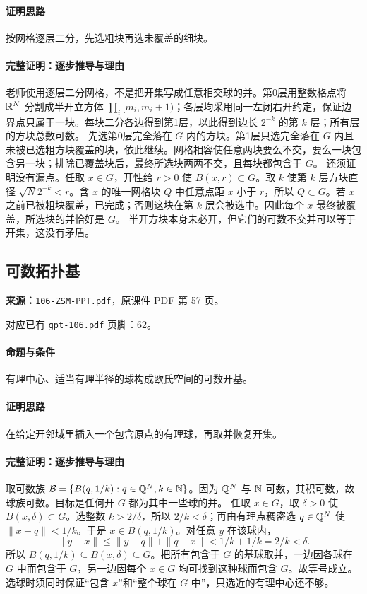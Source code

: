 \paragraph{证明思路}按网格逐层二分，先选粗块再选未覆盖的细块。
\paragraph{完整证明：逐步推导与理由}

老师使用逐层二分网格，不是把开集写成任意相交球的并。第0层用整数格点将 $\mathbb{R}^N$ 分割成半开立方体 $\prod_i[m_i,m_i+1)$；各层均采用同一左闭右开约定，保证边界点只属于一块。每块二分各边得到第1层，以此得到边长 $2^{-k}$ 的第 $k$ 层；所有层的方块总数可数。
先选第0层完全落在 $G$ 内的方块。第1层只选完全落在 $G$ 内且未被已选粗方块覆盖的块，依此继续。网格相容使任意两块要么不交，要么一块包含另一块；排除已覆盖块后，最终所选块两两不交，且每块都包含于 $G$。
还须证明没有漏点。任取 $x\in G$，开性给 $r>0$ 使 $B(x,r)\subset G$。取 $k$ 使第 $k$ 层方块直径 $\sqrt N2^{-k}<r$。含 $x$ 的唯一网格块 $Q$ 中任意点距 $x$ 小于 $r$，所以 $Q\subset G$。若 $x$ 之前已被粗块覆盖，已完成；否则这块在第 $k$ 层会被选中。因此每个 $x$ 最终被覆盖，所选块的并恰好是 $G$。
半开方块本身未必开，但它们的可数不交并可以等于开集，这没有矛盾。

\clearpage\subsection{可数拓扑基}
\textbf{来源：}\texttt{106-ZSM-PPT.pdf}，原课件 PDF 第 57 页。\par
对应已有 \texttt{gpt-106.pdf} 页脚：62。\par
\paragraph{命题与条件}有理中心、适当有理半径的球构成欧氏空间的可数开基。
\paragraph{证明思路}在给定开邻域里插入一个包含原点的有理球，再取并恢复开集。
\paragraph{完整证明：逐步推导与理由}

取可数族 $\mathcal B=\{B(q,1/k):q\in\mathbb{Q}^N,k\in\mathbb{N}\}$。因为 $\mathbb{Q}^N$ 与 $\mathbb{N}$ 可数，其积可数，故球族可数。目标是任何开 $G$ 都为其中一些球的并。
任取 $x\in G$，取 $\delta>0$ 使 $B(x,\delta)\subset G$。选整数 $k>2/\delta$，所以 $2/k<\delta$；再由有理点稠密选 $q\in\mathbb{Q}^N$ 使 $\|x-q\|<1/k$。于是 $x\in B(q,1/k)$。对任意 $y$ 在该球内，
\[\|y-x\|\le\|y-q\|+\|q-x\|<1/k+1/k=2/k<\delta.\]
所以 $B(q,1/k)\subseteq B(x,\delta)\subseteq G$。把所有包含于 $G$ 的基球取并，一边因各球在 $G$ 中而包含于 $G$，另一边因每个 $x\in G$ 均可找到这种球而包含 $G$。故等号成立。选球时须同时保证“包含 $x$”和“整个球在 $G$ 中”，只选近的有理中心还不够。

